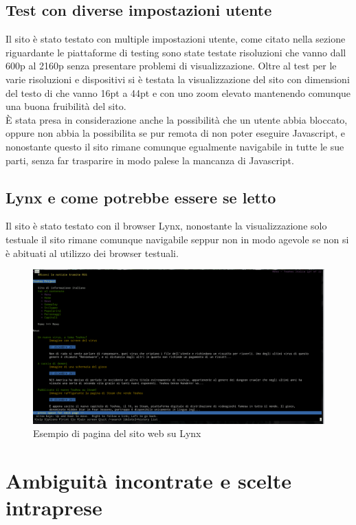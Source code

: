 \documentclass[openany, a4paper, 12pt]{report}
\begin{document}
		\section{Test con diverse impostazioni utente}
			Il sito è stato testato con multiple impostazioni utente, come citato nella sezione riguardante le piattaforme di testing sono state testate risoluzioni che vanno dall 600p al 2160p senza presentare problemi di visualizzazione. Oltre al test per le varie risoluzioni e dispositivi si è testata la visualizzazione del sito con dimensioni del testo di che vanno 16pt a 44pt e con uno zoom elevato mantenendo comunque una buona fruibilità del sito.\\
			\`{E} stata presa in considerazione anche la possibilità che un utente abbia bloccato, oppure non abbia la possibilita se pur remota di non poter eseguire Javascript, e nonostante questo il sito rimane comunque egualmente navigabile in tutte le sue parti, senza far trasparire in modo palese la mancanza di Javascript.\\

		\section{Lynx e come potrebbe essere se letto}
			Il sito è stato testato con il browser Lynx, nonostante la visualizzazione solo testuale il sito rimane comunque navigabile seppur non in modo agevole se non si è abituati al utilizzo dei browser testuali.
			\begin{figure}[H]
				\centering
				\includegraphics[width=1.2\linewidth]{images/Lynx2}
				\caption{Esempio di pagina del sito web su Lynx}
			\end{figure}
		

	\chapter{Ambiguità incontrate e scelte intraprese}
\end{document}
